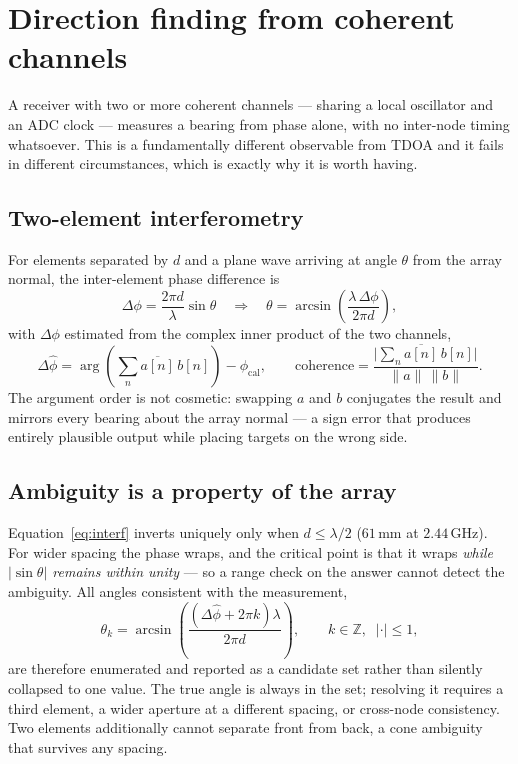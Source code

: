 \documentclass[11pt,a4paper]{article}
\begin{document}
\section{Direction finding from coherent channels}
\label{sec:df}

A receiver with two or more coherent channels --- sharing a local oscillator
and an ADC clock --- measures a bearing from phase alone, with no
inter-node timing whatsoever. This is a fundamentally different
observable from TDOA and it fails in different circumstances, which is
exactly why it is worth having.

\subsection{Two-element interferometry}

For elements separated by $d$ and a plane wave arriving at angle $\theta$
from the array normal, the inter-element phase difference is
\begin{equation}
  \Delta\phi = \frac{2\pi d}{\lambda}\sin\theta
  \quad\Longrightarrow\quad
  \theta = \arcsin\!\left(\frac{\lambda\,\Delta\phi}{2\pi d}\right),
  \label{eq:interf}
\end{equation}
with $\Delta\phi$ estimated from the complex inner product of the two
channels,
\begin{equation}
  \Delta\hat\phi = \arg\!\left(\sum_n \overline{a[n]}\,b[n]\right) - \phi_{\text{cal}},
  \qquad
  \text{coherence} = \frac{\bigl|\sum_n \overline{a[n]}\,b[n]\bigr|}
                          {\lVert a\rVert\,\lVert b\rVert}.
\end{equation}
The argument order is not cosmetic: swapping $a$ and $b$ conjugates the
result and mirrors every bearing about the array normal --- a sign error
that produces entirely plausible output while placing targets on the wrong
side.

\subsection{Ambiguity is a property of the array}

Equation~\eqref{eq:interf} inverts uniquely only when $d\le\lambda/2$
($61$\,mm at $2.44$\,GHz). For wider spacing the phase wraps, and the
critical point is that it wraps \emph{while $|\sin\theta|$ remains within
unity} --- so a range check on the answer cannot detect the ambiguity. All
angles consistent with the measurement,
\begin{equation}
  \theta_k = \arcsin\!\left(\frac{(\Delta\hat\phi+2\pi k)\lambda}{2\pi d}\right),
  \qquad k\in\mathbb{Z},\;\; |\cdot|\le 1,
\end{equation}
are therefore enumerated and reported as a candidate set rather than
silently collapsed to one value. The true angle is always in the set;
resolving it requires a third element, a wider aperture at a different
spacing, or cross-node consistency. Two elements additionally cannot
separate front from back, a cone ambiguity that survives any spacing.
\end{document}
